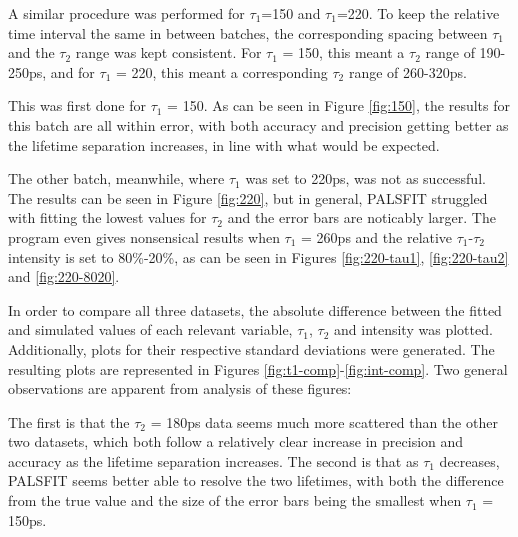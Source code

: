 A similar procedure was performed for $\tau_1$=150 and $\tau_1$=220. To keep the relative time interval the same in between batches, the corresponding spacing between $\tau_1$ and the $\tau_2$ range was kept consistent. For $\tau_1$ = 150, this meant a $\tau_2$ range of 190-250ps, and for $\tau_1$ = 220, this meant a corresponding $\tau_2$ range of 260-320ps.

This was first done for $\tau_1$ = 150. As can be seen in Figure \ref{fig:150}, the results for this batch are all within error, with both accuracy and precision getting better as the lifetime separation increases, in line with what would be expected.

The other batch, meanwhile, where $\tau_1$ was set to 220ps, was not as successful. The results can be seen in Figure \ref{fig:220}, but in general, PALSFIT struggled with fitting the lowest values for $\tau_2$ and the error bars are noticably larger. The program even gives nonsensical results when $\tau_1$ = 260ps and the relative $\tau_1$-$\tau_2$ intensity is set to 80\%-20\%, as can be seen in Figures \ref{fig:220-tau1}, \ref{fig:220-tau2} and \ref{fig:220-8020}.

In order to compare all three datasets, the absolute difference between the fitted and simulated values of each relevant variable, $\tau_1$, $\tau_2$ and intensity was plotted. Additionally, plots for their respective standard deviations were generated. The resulting plots are represented in Figures \ref{fig:t1-comp}-\ref{fig:int-comp}. Two general observations are apparent from analysis of these figures: 

The first is that the $\tau_2$ = 180ps data seems much more scattered than the other two datasets, which both follow a relatively clear increase in precision and accuracy as the lifetime separation increases. The second is that as $\tau_1$ decreases, PALSFIT seems better able to resolve the two lifetimes, with both the difference from the true value and the size of the error bars being the smallest when $\tau_1$ = 150ps.

